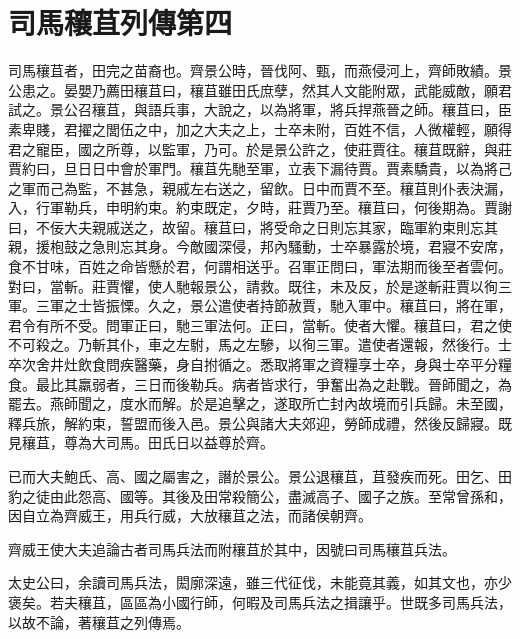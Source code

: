 \chapter{司馬穰苴列傳第四}

司馬穰苴者，田完之苗裔也。齊景公時，晉伐阿、甄，而燕侵河上，齊師敗績。景公患之。晏嬰乃薦田穰苴曰，穰苴雖田氏庶孽，然其人文能附眾，武能威敵，願君試之。景公召穰苴，與語兵事，大說之，以為將軍，將兵捍燕晉之師。穰苴曰，臣素卑賤，君擢之閭伍之中，加之大夫之上，士卒未附，百姓不信，人微權輕，願得君之寵臣，國之所尊，以監軍，乃可。於是景公許之，使莊賈往。穰苴既辭，與莊賈約曰，旦日日中會於軍門。穰苴先馳至軍，立表下漏待賈。賈素驕貴，以為將己之軍而己為監，不甚急，親戚左右送之，留飲。日中而賈不至。穰苴則仆表決漏，入，行軍勒兵，申明約束。約束既定，夕時，莊賈乃至。穰苴曰，何後期為。賈謝曰，不佞大夫親戚送之，故留。穰苴曰，將受命之日則忘其家，臨軍約束則忘其親，援枹鼓之急則忘其身。今敵國深侵，邦內騷動，士卒暴露於境，君寢不安席，食不甘味，百姓之命皆懸於君，何謂相送乎。召軍正問曰，軍法期而後至者雲何。對曰，當斬。莊賈懼，使人馳報景公，請救。既往，未及反，於是遂斬莊賈以徇三軍。三軍之士皆振慄。久之，景公遣使者持節赦賈，馳入軍中。穰苴曰，將在軍，君令有所不受。問軍正曰，馳三軍法何。正曰，當斬。使者大懼。穰苴曰，君之使不可殺之。乃斬其仆，車之左駙，馬之左驂，以徇三軍。遣使者還報，然後行。士卒次舍井灶飲食問疾醫藥，身自拊循之。悉取將軍之資糧享士卒，身與士卒平分糧食。最比其羸弱者，三日而後勒兵。病者皆求行，爭奮出為之赴戰。晉師聞之，為罷去。燕師聞之，度水而解。於是追擊之，遂取所亡封內故境而引兵歸。未至國，釋兵旅，解約束，誓盟而後入邑。景公與諸大夫郊迎，勞師成禮，然後反歸寢。既見穰苴，尊為大司馬。田氏日以益尊於齊。

已而大夫鮑氏、高、國之屬害之，譖於景公。景公退穰苴，苴發疾而死。田乞、田豹之徒由此怨高、國等。其後及田常殺簡公，盡滅高子、國子之族。至常曾孫和，因自立為齊威王，用兵行威，大放穰苴之法，而諸侯朝齊。

齊威王使大夫追論古者司馬兵法而附穰苴於其中，因號曰司馬穰苴兵法。

太史公曰，余讀司馬兵法，閎廓深遠，雖三代征伐，未能竟其義，如其文也，亦少褒矣。若夫穰苴，區區為小國行師，何暇及司馬兵法之揖讓乎。世既多司馬兵法，以故不論，著穰苴之列傳焉。